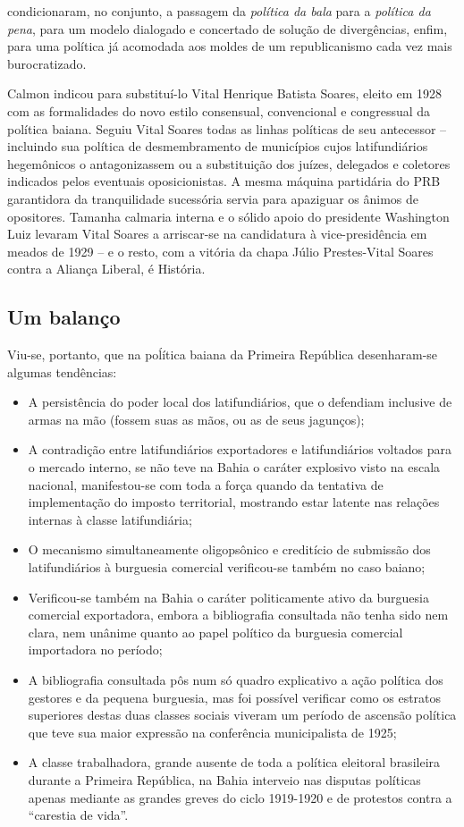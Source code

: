 condicionaram, no conjunto, a passagem da \textit{política da bala} para a \textit{política da pena}, para um modelo dialogado e concertado de solução de divergências, enfim, para uma política já acomodada aos moldes de um republicanismo cada vez mais burocratizado.

Calmon indicou para substituí-lo Vital Henrique Batista Soares, eleito em 1928 com as formalidades do novo estilo consensual, convencional e congressual da política baiana. Seguiu Vital Soares todas as linhas políticas de seu antecessor -- incluindo sua política de desmembramento de municípios cujos latifundiários hegemônicos o antagonizassem ou a substituição dos juízes, delegados e coletores indicados pelos eventuais oposicionistas. A mesma máquina partidária do PRB garantidora da tranquilidade sucessória servia para apaziguar os ânimos de opositores. Tamanha calmaria interna e o sólido apoio do presidente Washington Luiz levaram Vital Soares a arriscar-se na candidatura à vice-presidência em meados de 1929 -- e o resto, com a vitória da chapa Júlio Prestes-Vital Soares contra a Aliança Liberal, é História.

\subsection{Um balanço}

Viu-se, portanto, que na poĺítica baiana da Primeira República desenharam-se algumas tendências:

\begin{itemize}
\item A persistência do poder local dos latifundiários, que o defendiam inclusive de armas na mão (fossem suas as mãos, ou as de seus jagunços);
\item A contradição entre latifundiários exportadores e latifundiários voltados para o mercado interno, se não teve na Bahia o caráter explosivo visto na escala nacional, manifestou-se com toda a força quando da tentativa de implementação do imposto territorial, mostrando estar latente nas relações internas à classe latifundiária;
\item O mecanismo simultaneamente oligopsônico e creditício de submissão dos latifundiários à burguesia comercial verificou-se também no caso baiano;
\item Verificou-se também na Bahia o caráter politicamente ativo da burguesia comercial exportadora, embora a bibliografia consultada não tenha sido nem clara, nem unânime quanto ao papel político da burguesia comercial importadora no período;
\item A bibliografia consultada pôs num só quadro explicativo a ação política dos gestores e da pequena burguesia, mas foi possível verificar como os estratos superiores destas duas classes sociais viveram um período de ascensão política que teve sua maior expressão na conferência municipalista de 1925;
\item A classe trabalhadora, grande ausente de toda a política eleitoral brasileira durante a Primeira República, na Bahia interveio nas disputas políticas apenas mediante as grandes greves do ciclo 1919-1920 e de protestos contra a ``carestia de vida''.
\end{itemize}